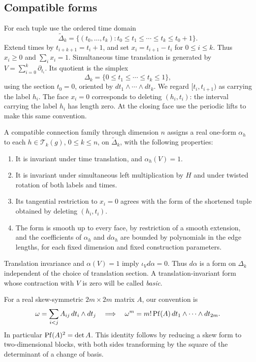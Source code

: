 \subsection{Compatible forms}
For each tuple use the ordered time domain
\[
 \widetilde\Delta_k
 =\{(t_0,\ldots,t_k):t_0\le t_1\le\cdots\le t_k\le t_0+1\}.
\]
Extend times by $t_{i+k+1}=t_i+1$, and set
$x_i=t_{i+1}-t_i$ for $0\le i\le k$. Thus $x_i\ge0$ and
$\sum_i x_i=1$. Simultaneous time translation is generated by
$V=\sum_{i=0}^k\partial_{t_i}$. Its quotient is the simplex
\[
 \Delta_k=\{0\le t_1\le\cdots\le t_k\le1\},
\]
using the section $t_0=0$, oriented by $dt_1\wedge\cdots\wedge dt_k$.
We regard $[t_i,t_{i+1})$ as carrying the label $h_i$.
The face $x_i=0$ corresponds to deleting $(h_i,t_i)$: the interval
carrying the label $h_i$ has length zero. At the closing face use the
periodic lifts to make this same convention.

\begin{definition}\label{cy:connection}
A compatible connection family through dimension $n$ assigns a real
one-form $\alpha_h$ to each $h\in\mathcal T_k(g)$, $0\le k\le n$,
on $\widetilde\Delta_k$, with the following properties:
\begin{enumerate}[label=\textup{(\roman*)}]
\item It is invariant under time translation, and $\alpha_h(V)=1$.
\item It is invariant under simultaneous left multiplication by $H$
and under twisted rotation of both labels and times.
\item Its tangential restriction to $x_i=0$ agrees with the form of
the shortened tuple obtained by deleting $(h_i,t_i)$.
\item The form is smooth up to every face, by restriction of a smooth
extension, and the coefficients of $\alpha_h$ and $d\alpha_h$ are bounded
by polynomials in the edge lengths, for each fixed dimension and fixed
construction parameters.
\end{enumerate}
\end{definition}

Translation invariance and $\alpha(V)=1$ imply
$\iota_Vd\alpha=0$. Thus $d\alpha$ is a form on $\Delta_k$ independent
of the choice of translation section. A translation-invariant form
whose contraction with $V$ is zero will be called \emph{basic}.

For a real skew-symmetric $2m\times2m$ matrix $A$, our convention is
\[
 \omega=\sum_{i<j}A_{ij}\,dt_i\wedge dt_j
 \quad\Longrightarrow\quad
 \omega^m=m!\operatorname{Pf}(A)\,dt_1\wedge\cdots\wedge dt_{2m}.
\]
In particular $\operatorname{Pf}(A)^2=\det A$. This identity follows by reducing a
skew form to two-dimensional blocks, with both sides transforming by
the square of the determinant of a change of basis.

